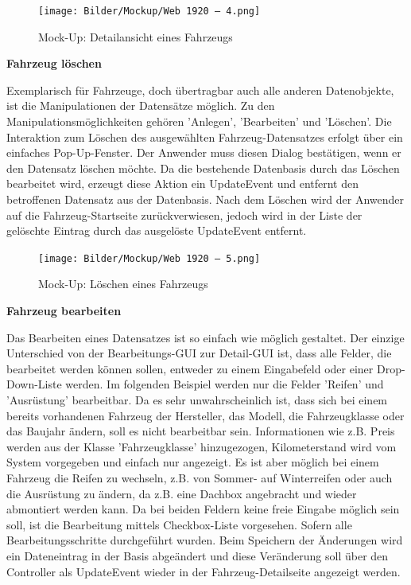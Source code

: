 \begin{figure}[!ht]
    \centering
    \texttt{[image: Bilder/Mockup/Web 1920 – 4.png]}
    \caption{Mock-Up: Detailansicht eines Fahrzeugs}
    \label{mu:fahrzeugdetails}
\end{figure}

\newpage

\textbf{Fahrzeug löschen}

Exemplarisch für Fahrzeuge, doch übertragbar auch alle anderen Datenobjekte, ist die Manipulationen der Datensätze möglich. 
Zu den Manipulationsmöglichkeiten gehören 'Anlegen', 'Bearbeiten' und 'Löschen'. 
Die Interaktion zum Löschen des ausgewählten Fahrzeug-Datensatzes erfolgt über ein einfaches Pop-Up-Fenster.  
Der Anwender muss diesen Dialog bestätigen, wenn er den Datensatz löschen möchte.
Da die bestehende Datenbasis durch das Löschen bearbeitet wird, erzeugt diese Aktion ein UpdateEvent und entfernt den betroffenen Datensatz aus der Datenbasis.
Nach dem Löschen wird der Anwender auf die Fahrzeug-Startseite zurückverwiesen, jedoch wird in der Liste der gelöschte Eintrag durch das ausgelöste UpdateEvent entfernt. 


\begin{figure}[!ht]
    \centering
    \texttt{[image: Bilder/Mockup/Web 1920 – 5.png]}
    \caption{Mock-Up: Löschen eines Fahrzeugs}
    \label{mu:loeschen}
\end{figure}

\newpage

\textbf{Fahrzeug bearbeiten}

Das Bearbeiten eines Datensatzes ist so einfach wie möglich gestaltet. 
Der einzige Unterschied von der Bearbeitungs-GUI zur Detail-GUI ist, dass alle Felder, die bearbeitet werden können sollen, entweder zu einem Eingabefeld oder einer Drop-Down-Liste werden. 
Im folgenden Beispiel werden nur die Felder 'Reifen' und 'Ausrüstung' bearbeitbar. 
Da es sehr unwahrscheinlich ist, dass sich bei einem bereits vorhandenen Fahrzeug der Hersteller, das Modell, die Fahrzeugklasse oder das Baujahr ändern, soll es nicht bearbeitbar sein. 
Informationen wie z.B. Preis werden aus der Klasse 'Fahrzeugklasse' hinzugezogen, Kilometerstand wird vom System vorgegeben und einfach nur angezeigt. 
Es ist aber möglich bei einem Fahrzeug die Reifen zu wechseln, z.B. von Sommer- auf Winterreifen oder auch die Ausrüstung zu ändern, da z.B. eine Dachbox angebracht und wieder abmontiert werden kann. 
Da bei beiden Feldern keine freie Eingabe möglich sein soll, ist die Bearbeitung mittels Checkbox-Liste vorgesehen. 
Sofern alle Bearbeitungsschritte durchgeführt wurden.
Beim Speichern der Änderungen wird ein Dateneintrag in der Basis abgeändert und diese Veränderung soll über den Controller als UpdateEvent wieder in der Fahrzeug-Detailseite angezeigt werden. 


